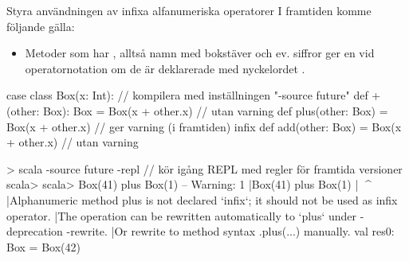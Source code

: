 \begin{Slide}{Styra användningen av infixa alfanumeriska operatorer}
I framtiden komme följande gälla:
\begin{itemize}
\item Metoder som har , alltså namn med bokstäver och ev. siffror ger en  vid operatornotation om de  är deklarerade med nyckelordet .   
\end{itemize}
\pause
\begin{Code}
case class Box(x: Int): // kompilera med inställningen "-source future"
  def +(other: Box): Box = Box(x + other.x)    // utan varning
  def plus(other: Box) = Box(x + other.x)      // ger varning (i framtiden)
  infix def add(other: Box) = Box(x + other.x) // utan varning
\end{Code}
\begin{REPLsmall}
> scala -source future -repl // kör igång REPL med regler för framtida versioner
scala> scala> Box(41) plus Box(1)
-- Warning:
1 |Box(41) plus Box(1)
  |        ^^^^
  |Alphanumeric method plus is not declared `infix`; it should not be used as infix operator.
  |The operation can be rewritten automatically to `plus` under -deprecation -rewrite.
  |Or rewrite to method syntax .plus(...) manually.
val res0: Box = Box(42)
\end{REPLsmall}
\end{Slide}




